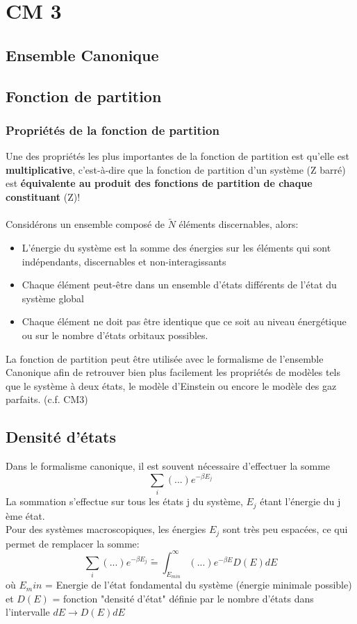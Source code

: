 \documentclass{article}
\newcommand{\insertslide}[3]{
\begin{center}
    \fbox{\texttt{[image: \#1]}}
\end{center}
}
\begin{document}
\section{CM 3}
    \subsection{Ensemble Canonique}
        \insertslide{Slides/CM3}{2}{.6}
    \subsection{Fonction de partition}
        \insertslide{Slides/CM3}{3}{.6}
        \insertslide{Slides/CM3}{4}{.6}
        \subsubsection{Propriétés de la fonction de partition}
            Une des propriétés les plus importantes de la fonction de partition est qu'elle est \textbf{multiplicative},
            c'est-à-dire que la fonction de partition d'un système (Z barré) est \textbf{équivalente au produit des fonctions de partition
            de chaque constituant} (Z)!\\\\
            Considérons un ensemble composé de $\tilde N$ éléments discernables, alors:
            \begin{itemize}
                \item L’énergie du système est la somme des énergies sur les éléments
                qui sont indépendants, discernables et non-interagissants
                \item Chaque élément peut-être dans un ensemble d’états différents de l'état du système global
                \item Chaque élément ne doit pas être identique que ce soit au niveau
                énergétique ou sur le nombre d’états orbitaux possibles.
            \end{itemize}
            La fonction de partition peut être utilisée avec le formalisme de l'ensemble Canonique
            afin de retrouver bien plus facilement les propriétés de modèles tels que le système à 
            deux états, le modèle d'Einstein ou encore le modèle des gaz parfaits. (c.f. CM3)
    
    \subsection{Densité d'états}
        Dans le formalisme canonique, il est souvent nécessaire d'effectuer la somme
        $$
        \sum_i (...) e^{-\beta E_j}
        $$
        La sommation s’effectue sur tous les états j du système, $E_j$ étant l’énergie du j ème état.\\
        Pour des systèmes macroscopiques, les énergies $E_j$ sont très peu espacées, ce qui permet de remplacer la somme:
        $$
        \sum_i (...) e^{-\beta E_j} \tilde = \int_{E_{min}}^\infty (...) e^{-\beta E} D(E) dE
        $$
        où $E_min$ = Energie de l’état fondamental du système (énergie minimale possible) et
        $D(E)$ = fonction "densité d’état" définie par le nombre d’états dans l’intervalle $dE \rightarrow D(E)dE$
\end{document}
